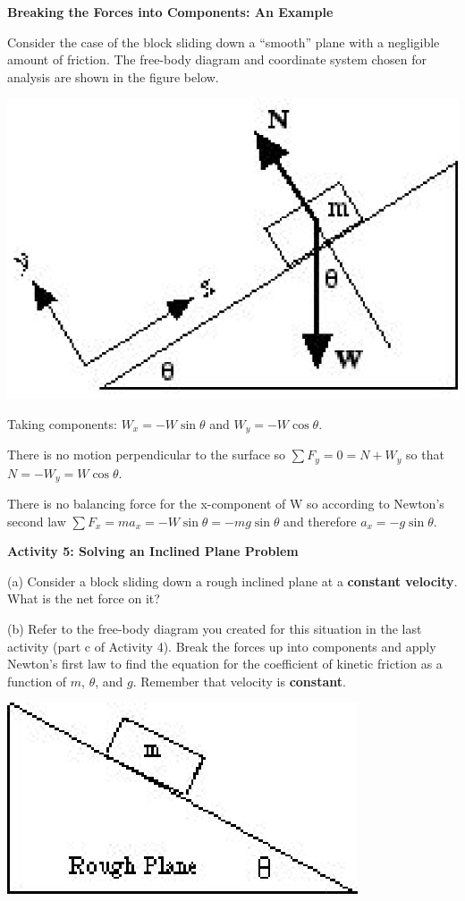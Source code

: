 \textbf{Breaking the Forces into Components: An Example} 

Consider the case of the block sliding down a ``smooth'' plane
with a negligible amount of friction. The free-body diagram and coordinate system
chosen for analysis are shown in the figure below.

\vspace{0.3cm}
{\par\centering \includegraphics{friction/friction_fig6.eps} \par}
\vspace{0.3cm}

Taking components: \( W_{x}  = -W \sin  \theta  \) and \(W_{y} = -W
\cos  \theta  \).

There is no motion perpendicular to the surface so \( \sum F_y
= 0 = N + W_{y} \) so that $N = -W _{y}  = W \cos \theta$.

There is no balancing force for the x-component of W so according to Newton's
second law \( \sum F_{x}  = ma_{x} = -W \sin \theta
= - mg \sin \theta  \) and therefore \( a_{x} = - g \sin \theta  \).

\textbf{Activity 5: Solving an Inclined Plane Problem} 

(a) Consider a block sliding down a rough inclined plane at a \textbf{constant velocity}. What is the net force on it?
\vspace{20mm}

(b) Refer to the free-body diagram you created for this situation in the last
activity (part c of Activity 4). Break the forces up into components and apply Newton's first law to
find the equation for the coefficient of kinetic friction as a function of $m$,
\( \theta  \), and $g$. Remember that velocity is \textbf{constant}.

\vspace{0.3cm}
{\par\centering \includegraphics{friction/friction_fig4.eps} \par}
\vspace{0.3cm}

